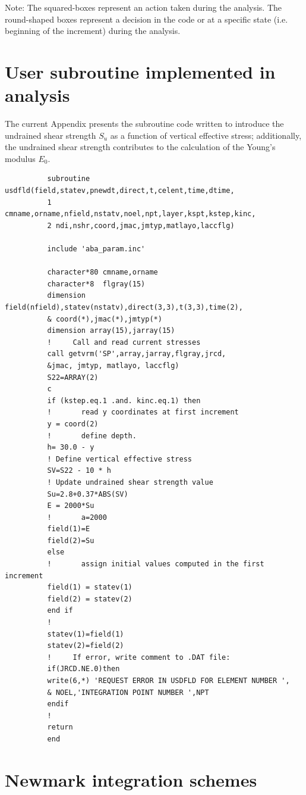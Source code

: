 \documentclass[11pt,a4paper]{report}
\begin{document}
\vspace*{3cm}
Note: The squared-boxes represent an action taken during the analysis. The round-shaped boxes represent a decision in the code or at a specific state (i.e. beginning of the increment) during the analysis.
\newpage
\chapter{User subroutine implemented in analysis} \label{subroutine}
The current Appendix presents the subroutine code written to introduce the undrained shear strength $S_u$ as a function of vertical effective stress; additionally, the undrained shear strength contributes to the calculation of the Young's modulus $E_0$.

\begin{lstlisting}
	      subroutine usdfld(field,statev,pnewdt,direct,t,celent,time,dtime,
	      1 cmname,orname,nfield,nstatv,noel,npt,layer,kspt,kstep,kinc,
	      2 ndi,nshr,coord,jmac,jmtyp,matlayo,laccflg)
	      
	      include 'aba_param.inc'
	      
	      character*80 cmname,orname
	      character*8  flgray(15)
	      dimension field(nfield),statev(nstatv),direct(3,3),t(3,3),time(2),
	      & coord(*),jmac(*),jmtyp(*)
	      dimension array(15),jarray(15)
	      !     Call and read current stresses 
	      call getvrm('SP',array,jarray,flgray,jrcd,
	      &jmac, jmtyp, matlayo, laccflg)
	      S22=ARRAY(2)
	      c
	      if (kstep.eq.1 .and. kinc.eq.1) then
	      !       read y coordinates at first increment
	      y = coord(2)
	      !       define depth. 
	      h= 30.0 - y
	      ! Define vertical effective stress
	      SV=S22 - 10 * h
	      !	Update undrained shear strength value
	      Su=2.8+0.37*ABS(SV)
	      E = 2000*Su
	      !       a=2000
	      field(1)=E
	      field(2)=Su
	      else
	      !       assign initial values computed in the first increment
	      field(1) = statev(1)
	      field(2) = statev(2)
	      end if 
	      !
	      statev(1)=field(1)
	      statev(2)=field(2)
	      !     If error, write comment to .DAT file:
	      if(JRCD.NE.0)then
	      write(6,*) 'REQUEST ERROR IN USDFLD FOR ELEMENT NUMBER ',
	      & NOEL,'INTEGRATION POINT NUMBER ',NPT
	      endif
	      !
	      return
	      end
\end{lstlisting}


\newpage
\chapter{Newmark integration schemes} \label{App:AppendixH}
\end{document}
